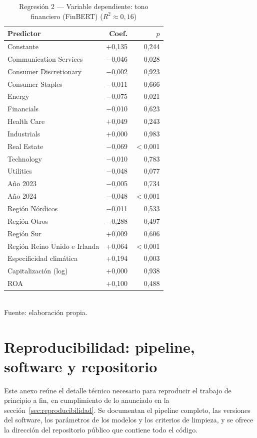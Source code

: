 \begin{table}[H]
\centering
\caption{Regresión 2 --- Variable dependiente: tono financiero (FinBERT) ($R^2\approx0{,}16$)}
\label{tab:reg2-full}
\begin{tabular}{lrr}
\toprule
\textbf{Predictor} & \textbf{Coef.} & \textbf{$p$} \\
\midrule
Constante & +0,135 & 0,244 \\
Communication Services & $-$0,046 & 0,028 \\
Consumer Discretionary & $-$0,002 & 0,923 \\
Consumer Staples & $-$0,011 & 0,666 \\
Energy & $-$0,075 & 0,021 \\
Financials & $-$0,010 & 0,623 \\
Health Care & +0,049 & 0,243 \\
Industrials & +0,000 & 0,983 \\
Real Estate & $-$0,069 & $<$0,001 \\
Technology & $-$0,010 & 0,783 \\
Utilities & $-$0,048 & 0,077 \\
Año 2023 & $-$0,005 & 0,734 \\
Año 2024 & $-$0,048 & $<$0,001 \\
Región Nórdicos & $-$0,011 & 0,533 \\
Región Otros & $-$0,288 & 0,497 \\
Región Sur & +0,009 & 0,606 \\
Región Reino Unido e Irlanda & +0,064 & $<$0,001 \\
Especificidad climática & +0,194 & 0,003 \\
Capitalización (log) & +0,000 & 0,938 \\
ROA & +0,100 & 0,488 \\
\bottomrule
\end{tabular}
\\[4pt]
{\footnotesize Fuente: elaboración propia.}
\end{table}

\chapter{Reproducibilidad: pipeline, software y repositorio}
\label{anexo:reproducibilidad}

Este anexo reúne el detalle técnico necesario para reproducir el trabajo de principio a fin,
en cumplimiento de lo anunciado en la sección~\ref{sec:reproducibilidad}. Se documentan el
pipeline completo, las versiones del software, los parámetros de los modelos y los criterios de
limpieza, y se ofrece la dirección del repositorio público que contiene todo el código.

